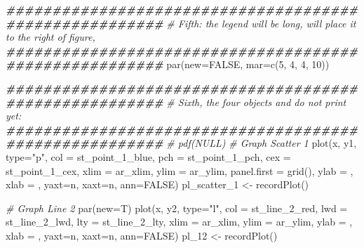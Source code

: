 \documentclass[
]{book}
\newenvironment{Shaded}{\begin{snugshade}}{\end{snugshade}}
\newcommand{\AttributeTok}[1]{\textcolor[rgb]{0.77,0.63,0.00}{#1}}
\newcommand{\CommentTok}[1]{\textcolor[rgb]{0.56,0.35,0.01}{\textit{#1}}}
\newcommand{\ConstantTok}[1]{\textcolor[rgb]{0.00,0.00,0.00}{#1}}
\newcommand{\DecValTok}[1]{\textcolor[rgb]{0.00,0.00,0.81}{#1}}
\newcommand{\DocumentationTok}[1]{\textcolor[rgb]{0.56,0.35,0.01}{\textbf{\textit{#1}}}}
\newcommand{\FunctionTok}[1]{\textcolor[rgb]{0.00,0.00,0.00}{#1}}
\newcommand{\NormalTok}[1]{#1}
\newcommand{\OtherTok}[1]{\textcolor[rgb]{0.56,0.35,0.01}{#1}}
\newcommand{\StringTok}[1]{\textcolor[rgb]{0.31,0.60,0.02}{#1}}
\begin{document}
\begin{Shaded}
\begin{Highlighting}[]
\DocumentationTok{\#\#\#\#\#\#\#\#\#\#\#\#\#\#\#\#\#\#\#\#\#\#\#\#\#\#\#\#\#\#\#\#\#\#\#\#\#\#\#\#\#\#\#\#\#\#\#\#\#\#\#\#\#\#\#}
\CommentTok{\# Fifth: the legend will be long, will place it to the right of figure,}
\DocumentationTok{\#\#\#\#\#\#\#\#\#\#\#\#\#\#\#\#\#\#\#\#\#\#\#\#\#\#\#\#\#\#\#\#\#\#\#\#\#\#\#\#\#\#\#\#\#\#\#\#\#\#\#\#\#\#\#}
\FunctionTok{par}\NormalTok{(}\AttributeTok{new=}\ConstantTok{FALSE}\NormalTok{, }\AttributeTok{mar=}\FunctionTok{c}\NormalTok{(}\DecValTok{5}\NormalTok{, }\DecValTok{4}\NormalTok{, }\DecValTok{4}\NormalTok{, }\DecValTok{10}\NormalTok{))}

\DocumentationTok{\#\#\#\#\#\#\#\#\#\#\#\#\#\#\#\#\#\#\#\#\#\#\#\#\#\#\#\#\#\#\#\#\#\#\#\#\#\#\#\#\#\#\#\#\#\#\#\#\#\#\#\#\#\#\#}
\CommentTok{\# Sixth, the four objects and do not print yet:}
\DocumentationTok{\#\#\#\#\#\#\#\#\#\#\#\#\#\#\#\#\#\#\#\#\#\#\#\#\#\#\#\#\#\#\#\#\#\#\#\#\#\#\#\#\#\#\#\#\#\#\#\#\#\#\#\#\#\#\#}
\CommentTok{\# pdf(NULL)}
\CommentTok{\# Graph Scatter 1}
\FunctionTok{plot}\NormalTok{(x, y1, }\AttributeTok{type=}\StringTok{"p"}\NormalTok{,}
     \AttributeTok{col =}\NormalTok{ st\_point\_1\_blue,}
     \AttributeTok{pch =}\NormalTok{ st\_point\_1\_pch, }\AttributeTok{cex =}\NormalTok{ st\_point\_1\_cex,}
     \AttributeTok{xlim =}\NormalTok{ ar\_xlim, }\AttributeTok{ylim =}\NormalTok{ ar\_ylim,}
     \AttributeTok{panel.first =} \FunctionTok{grid}\NormalTok{(),}
     \AttributeTok{ylab =} \StringTok{\textquotesingle{}\textquotesingle{}}\NormalTok{, }\AttributeTok{xlab =} \StringTok{\textquotesingle{}\textquotesingle{}}\NormalTok{, }\AttributeTok{yaxt=}\StringTok{\textquotesingle{}n\textquotesingle{}}\NormalTok{, }\AttributeTok{xaxt=}\StringTok{\textquotesingle{}n\textquotesingle{}}\NormalTok{, }\AttributeTok{ann=}\ConstantTok{FALSE}\NormalTok{)}
\NormalTok{pl\_scatter\_1 }\OtherTok{\textless{}{-}} \FunctionTok{recordPlot}\NormalTok{()}

\CommentTok{\# Graph Line 2}
\FunctionTok{par}\NormalTok{(}\AttributeTok{new=}\NormalTok{T)}
\FunctionTok{plot}\NormalTok{(x, y2, }\AttributeTok{type=}\StringTok{"l"}\NormalTok{,}
     \AttributeTok{col =}\NormalTok{ st\_line\_2\_red,}
     \AttributeTok{lwd =}\NormalTok{ st\_line\_2\_lwd, }\AttributeTok{lty =}\NormalTok{ st\_line\_2\_lty,}
     \AttributeTok{xlim =}\NormalTok{ ar\_xlim, }\AttributeTok{ylim =}\NormalTok{ ar\_ylim,}
     \AttributeTok{ylab =} \StringTok{\textquotesingle{}\textquotesingle{}}\NormalTok{, }\AttributeTok{xlab =} \StringTok{\textquotesingle{}\textquotesingle{}}\NormalTok{, }\AttributeTok{yaxt=}\StringTok{\textquotesingle{}n\textquotesingle{}}\NormalTok{, }\AttributeTok{xaxt=}\StringTok{\textquotesingle{}n\textquotesingle{}}\NormalTok{, }\AttributeTok{ann=}\ConstantTok{FALSE}\NormalTok{)}
\NormalTok{pl\_12 }\OtherTok{\textless{}{-}} \FunctionTok{recordPlot}\NormalTok{()}


\end{Highlighting}
\end{Shaded}
\end{document}
